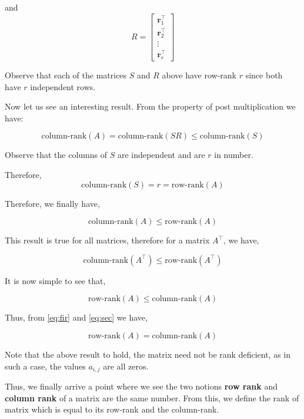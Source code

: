 \documentclass[a4paper]{article}
\begin{document}
and 
\begin{equation}
R = \begin{bmatrix}
\boldsymbol{r}_1^{\top} \\
\boldsymbol{r}_2^{\top} \\
\vdots \\
\boldsymbol{r}_r^{\top}
\end{bmatrix}
\end{equation}

Observe that each of the matrices $S$ and $R$ above have row-rank $r$ since both have $r$ independent rows.

Now let us see an interesting result. From the property of post multiplication we have:

\begin{equation}
\text{column-rank}(A) = \text{column-rank}(SR) \leq \text{column-rank}(S)
\end{equation}

Observe that the columns of $S$ are independent and are $r$ in number. 

Therefore,
\begin{equation}
\text{column-rank}(S) = r = \text{row-rank}(A)
\end{equation}

Therefore, we finally have,

\begin{equation}
\text{column-rank}(A) \leq \text{row-rank}(A)
\label{eq:fir}
\end{equation}

This result is true for all matrices, therefore for a matrix $A^{\top}$, we have,

\begin{equation}
\text{column-rank}(A^{\top}) \leq \text{row-rank}(A^{\top})
\end{equation}

It is now simple to see that,

\begin{equation}
\text{row-rank}(A) \leq \text{column-rank}(A)
\label{eq:sec}
\end{equation}

Thus, from \ref{eq:fir} and \ref{eq:sec} we have,

\begin{equation}
\text{row-rank}(A) = \text{column-rank}(A)
\end{equation}

Note that the above result to hold, the matrix need not be rank deficient, as in such a case, the values $a_{i,j}$ are all zeros.

Thus, we finally arrive a point where we see the two notions \textbf{row rank} and \textbf{column rank} of a matrix are the same number. From this, we define the rank of matrix which is equal to its row-rank and the column-rank.
\end{document}
